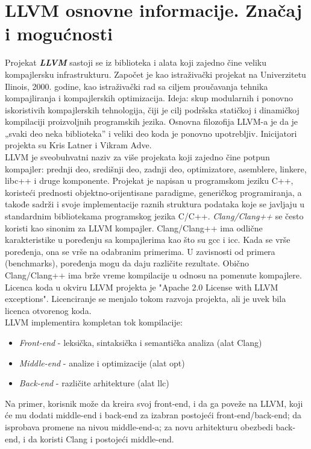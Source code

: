 \documentclass[10pt]{extarticle}
\begin{document}
\section{LLVM osnovne informacije. Značaj i mogućnosti}
\noindent
Projekat \textit{\textbf{LLVM}} sastoji se iz biblioteka i alata koji zajedno čine veliku kompajlersku infrastrukturu. Započet je kao istraživački projekat na Univerzitetu Ilinois, 2000. godine, kao istraživački rad sa ciljem proučavanja tehnika kompajliranja i kompajlerskih optimizacija. Ideja: skup modularnih i ponovno iskoristivih kompajlerskih tehnologija, čiji je cilj podršska statičkoj i dinamičkoj kompilaciji proizvoljnih programskih jezika. 
Osnovna filozofija LLVM-a je da je „svaki deo neka biblioteka” i veliki deo koda je ponovno upotrebljiv. Inicijatori projekta su Kris Latner i Vikram Adve. \\
LLVM je sveobuhvatni naziv za više projekata koji zajedno čine potpun kompajler: prednji deo, središnji deo, zadnji deo, optimizatore, asemblere, linkere, libc++ i druge komponente. Projekat je napisan u programskom jeziku C++, koristeći prednosti objektno-orijentisane paradigme, generičkog programiranja, a takođe sadrži i svoje implementacije raznih struktura podataka koje se javljaju u standardnim bibliotekama programskog jezika C/C++.
\textit{Clang/Clang++} se često koristi kao sinonim za LLVM kompajler. Clang/Clang++ ima odlične karakteristike u poređenju sa kompajlerima kao što su gcc i icc. Kada se vrše poređenja, ona se vrše na odabranim primerima. U zavisnosti od primera (benchmarks), poređenja mogu da daju različite rezultate. Obično Clang/Clang++ ima brže vreme kompilacije u odnosu na pomenute kompajlere. \\
Licenca koda u okviru LLVM projekta je "Apache 2.0 License with LLVM exceptions". Licenciranje se menjalo tokom razvoja projekta, ali je uvek bila licenca otvorenog koda.\\
LLVM implementira kompletan tok kompilacije: 
\begin{itemize}
    \item \textit{Front-end} - leksička, sintaksička i semantička analiza (alat Clang)
    \item \textit{Middle-end} - analize i optimizacije (alat opt)
    \item \textit{Back-end} - različite arhitekture (alat llc)
\end{itemize}
Na primer, korisnik može da kreira svoj front-end, i da ga poveže na LLVM, koji će mu dodati middle-end i back-end za izabran postojeći front-end/back-end; da isprobava promene na nivou middle-end-a; za novu arhitekturu obezbedi back-end, i da koristi Clang i postojeći middle-end.
\end{document}
